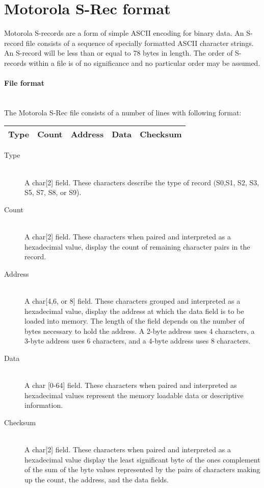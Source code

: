 \clearpage
\section{Motorola S-Rec format}
    Motorola S-records are a form of simple ASCII encoding for binary data. An S-record file consists of a sequence of specially formatted ASCII character strings. An S-record will be less than or equal to 78 bytes in length. The order of S-records within a file is of no significance and no particular order may be assumed.

    \paragraph{File format}
        ~\\
        The Motorola S-Rec file consists of a number of lines with following format:\\
        \begin{tabular}{|ccccc|}
            \hline
            Type & Count & Address & Data & Checksum \\
            \hline
        \end{tabular}

    \begin{description}
        \item[Type]~\\
            A char[2] field. These characters describe the type of record (S0,S1, S2, S3, S5, S7, S8, or S9).

        \item[Count]~\\
            A char[2] field. These characters when paired and interpreted as a hexadecimal value, display the count of remaining character pairs in the record.

        \item[Address]~\\
            A char[4,6, or 8] field. These characters grouped and interpreted as a hexadecimal value, display the address at which the data field is to be loaded into memory. The length of the field depends on the number of bytes necessary to hold the address. A 2-byte address uses 4 characters, a 3-byte address uses 6 characters, and a 4-byte address uses 8 characters.

        \item[Data]~\\
            A char [0-64] field. These characters when paired and interpreted as hexadecimal values represent the memory loadable data or descriptive information.

        \item[Checksum]~\\
            A char[2] field. These characters when paired and interpreted as a hexadecimal value display the least significant byte of the ones complement of the sum of the byte values represented by the pairs of characters making up the count, the address, and the data fields.
    \end{description}

